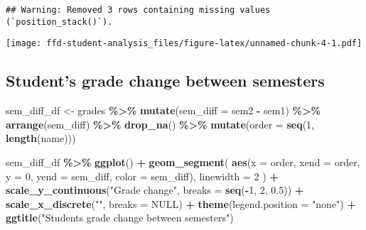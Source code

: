 \documentclass[
]{article}
\newenvironment{Shaded}{\begin{snugshade}}{\end{snugshade}}
\newcommand{\AttributeTok}[1]{\textcolor[rgb]{0.13,0.29,0.53}{#1}}
\newcommand{\ConstantTok}[1]{\textcolor[rgb]{0.56,0.35,0.01}{#1}}
\newcommand{\DecValTok}[1]{\textcolor[rgb]{0.00,0.00,0.81}{#1}}
\newcommand{\FloatTok}[1]{\textcolor[rgb]{0.00,0.00,0.81}{#1}}
\newcommand{\FunctionTok}[1]{\textcolor[rgb]{0.13,0.29,0.53}{\textbf{#1}}}
\newcommand{\NormalTok}[1]{#1}
\newcommand{\OtherTok}[1]{\textcolor[rgb]{0.56,0.35,0.01}{#1}}
\newcommand{\SpecialCharTok}[1]{\textcolor[rgb]{0.81,0.36,0.00}{\textbf{#1}}}
\newcommand{\StringTok}[1]{\textcolor[rgb]{0.31,0.60,0.02}{#1}}
\begin{document}
\begin{verbatim}
## Warning: Removed 3 rows containing missing values (`position_stack()`).
\end{verbatim}

\texttt{[image: ffd-student-analysis\_files/figure-latex/unnamed-chunk-4-1.pdf]}

\hypertarget{students-grade-change-between-semesters}{%
\subsection{Student's grade change between
semesters}\label{students-grade-change-between-semesters}}

\begin{Shaded}
\begin{Highlighting}[]
\NormalTok{sem\_diff\_df }\OtherTok{\textless{}{-}}\NormalTok{ grades }\SpecialCharTok{\%\textgreater{}\%}
  \FunctionTok{mutate}\NormalTok{(}\AttributeTok{sem\_diff =}\NormalTok{ sem2 }\SpecialCharTok{{-}}\NormalTok{ sem1) }\SpecialCharTok{\%\textgreater{}\%}
  \FunctionTok{arrange}\NormalTok{(sem\_diff) }\SpecialCharTok{\%\textgreater{}\%}
  \FunctionTok{drop\_na}\NormalTok{() }\SpecialCharTok{\%\textgreater{}\%}
  \FunctionTok{mutate}\NormalTok{(}\AttributeTok{order =} \FunctionTok{seq}\NormalTok{(}\DecValTok{1}\NormalTok{, }\FunctionTok{length}\NormalTok{(name)))}

\NormalTok{sem\_diff\_df }\SpecialCharTok{\%\textgreater{}\%}
  \FunctionTok{ggplot}\NormalTok{() }\SpecialCharTok{+}
  \FunctionTok{geom\_segment}\NormalTok{(}
    \FunctionTok{aes}\NormalTok{(}\AttributeTok{x =}\NormalTok{ order, }\AttributeTok{xend =}\NormalTok{ order, }\AttributeTok{y =} \DecValTok{0}\NormalTok{, }\AttributeTok{yend =}\NormalTok{ sem\_diff, }\AttributeTok{color =}\NormalTok{ sem\_diff),}
    \AttributeTok{linewidth =} \DecValTok{2}
\NormalTok{  ) }\SpecialCharTok{+}
  \FunctionTok{scale\_y\_continuous}\NormalTok{(}\StringTok{"Grade change"}\NormalTok{, }\AttributeTok{breaks =} \FunctionTok{seq}\NormalTok{(}\SpecialCharTok{{-}}\DecValTok{1}\NormalTok{, }\DecValTok{2}\NormalTok{, }\FloatTok{0.5}\NormalTok{)) }\SpecialCharTok{+}
  \FunctionTok{scale\_x\_discrete}\NormalTok{(}\StringTok{""}\NormalTok{, }\AttributeTok{breaks =} \ConstantTok{NULL}\NormalTok{) }\SpecialCharTok{+} 
  \FunctionTok{theme}\NormalTok{(}\AttributeTok{legend.position =} \StringTok{"none"}\NormalTok{) }\SpecialCharTok{+} 
  \FunctionTok{ggtitle}\NormalTok{(}\StringTok{"Student\textquotesingle{}s grade change between semesters"}\NormalTok{)}
\end{Highlighting}
\end{Shaded}
\end{document}
